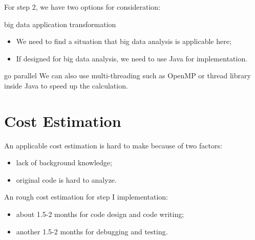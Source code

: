 \documentclass[notheorems, aspectratio=54]{beamer}
\begin{document}
\begin{frame}[fragile]

For step 2, we have two options for consideration:
\begin{block}{big data application transformation}
 \begin{itemize}
 \item  We need to find a situation that big data analysis is applicable here;
 \item  If designed for big data analysis, we need to use Java for implementation.
\end{itemize}
\end{block}

\begin{block}{go parallel}
 We can also use multi-threading such as OpenMP or thread library inside Java to speed up
 the calculation.
\end{block}

\end{frame}

\section{Cost Estimation}
\begin{frame}

An applicable cost estimation is hard to make because of two factors:
\begin{itemize}
 \item  lack of background knowledge; 
 \item  original code is hard to analyze.
\end{itemize}

An rough cost estimation for step I implementation:
\begin{itemize}
 \item about 1.5-2 months for code design and code writing;
 \item another 1.5-2 months for debugging and testing.
\end{itemize}


\end{frame}

\end{document}
